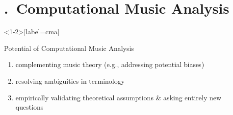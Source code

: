\section{\thesection.~Computational Music Analysis}


\begin{frame}<1-2>[label=cma]{\insertsectionhead}

  Potential of Computational Music Analysis
  \begin{enumerate}
    \item<2-> complementing music theory (e.g., addressing potential biases)
    \item<3-> resolving ambiguities in terminology
    \item<4-> empirically validating theoretical assumptions \& asking entirely new questions
  \end{enumerate}





\end{frame}

